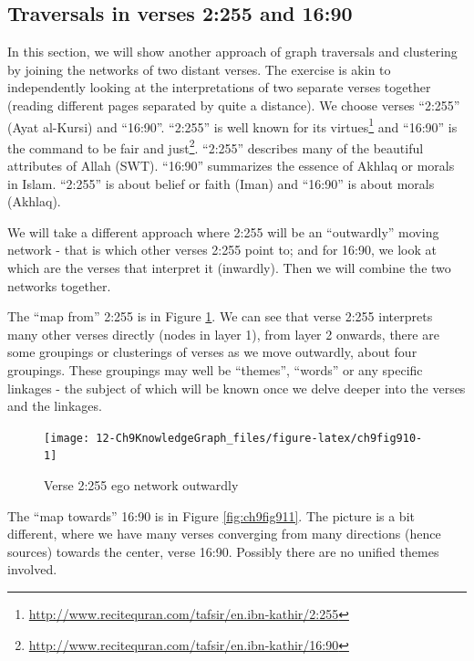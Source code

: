 \documentclass[
]{article}
\begin{document}
\hypertarget{traversals-in-verses-2:255-and-16:90}{%
\subsection{Traversals in verses 2:255 and 16:90}\label{traversals-in-verses-2:255-and-16:90}}

In this section, we will show another approach of graph traversals and clustering by joining the networks of two distant verses. The exercise is akin to independently looking at the interpretations of two separate verses together (reading different pages separated by quite a distance). We choose verses ``2:255'' (Ayat al-Kursi) and ``16:90''. ``2:255'' is well known for its virtues\footnote{\url{http://www.recitequran.com/tafsir/en.ibn-kathir/2:255}} and ``16:90'' is the command to be fair and just\footnote{\url{http://www.recitequran.com/tafsir/en.ibn-kathir/16:90}}. ``2:255'' describes many of the beautiful attributes of Allah (SWT). ``16:90'' summarizes the essence of Akhlaq or morals in Islam. ``2:255'' is about belief or faith (Iman) and ``16:90'' is about morals (Akhlaq).

We will take a different approach where 2:255 will be an ``outwardly'' moving network - that is which other verses 2:255 point to; and for 16:90, we look at which are the verses that interpret it (inwardly). Then we will combine the two networks together.

The ``map from'' 2:255 is in Figure \ref{fig:ch9fig910}. We can see that verse 2:255 interprets many other verses directly (nodes in layer 1), from layer 2 onwards, there are some groupings or clusterings of verses as we move outwardly, about four groupings. These groupings may well be ``themes'', ``words'' or any specific linkages - the subject of which will be known once we delve deeper into the verses and the linkages.

\begin{figure}

{\centering \texttt{[image: 12-Ch9KnowledgeGraph\_files/figure-latex/ch9fig910-1]} 

}

\caption{Verse 2:255 ego network outwardly}\label{fig:ch9fig910}
\end{figure}

The ``map towards'' 16:90 is in Figure \ref{fig:ch9fig911}. The picture is a bit different, where we have many verses converging from many directions (hence sources) towards the center, verse 16:90. Possibly there are no unified themes involved.
\end{document}
